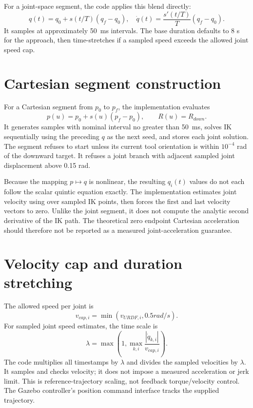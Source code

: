 For a joint-space segment, the code applies this blend directly:
\begin{equation}
 q(t)=q_0+s(t/T)(q_f-q_0),\quad
 \dot q(t)=\frac{s'(t/T)}{T}(q_f-q_0).
 \label{eq:joint-quintic}
\end{equation}
It samples at approximately \SI{50}{ms} intervals. The base duration defaults
to 8 s for the approach, then time-stretches if a sampled speed exceeds the
allowed joint speed cap.

\section{Cartesian segment construction}
For a Cartesian segment from $p_0$ to $p_f$, the implementation evaluates
\begin{equation}
 p(u)=p_0+s(u)(p_f-p_0),\qquad R(u)=R_{down}.
\end{equation}
It generates samples with nominal interval no greater than \SI{50}{ms}, solves
IK sequentially using the preceding $q$ as the next seed, and stores each
joint solution. The segment refuses to start unless its current tool
orientation is within $10^{-4}$ rad of the downward target. It refuses a
joint branch with adjacent sampled joint displacement above 0.15 rad.

Because the mapping $p\mapsto q$ is nonlinear, the resulting $q_i(t)$ values
do not each follow the scalar quintic equation exactly. The implementation
estimates joint velocity using  over sampled IK points,
then forces the first and last velocity vectors to zero. Unlike the joint
segment, it does not compute the analytic second derivative of the IK path.
The theoretical zero endpoint Cartesian acceleration should therefore not be
reported as a measured joint-acceleration guarantee.

\section{Velocity cap and duration stretching}
The allowed speed per joint is
\begin{equation}
 v_{cap,i}=\min(v_{URDF,i},0.5\si{rad/s}).
\end{equation}
For sampled joint speed estimates, the time scale is
\begin{equation}
 \lambda=\max\left(1,\max_{k,i}\frac{|\dot q_{k,i}|}{v_{cap,i}}\right).
 \label{eq:time-stretch}
\end{equation}
The code multiplies all timestamps by $\lambda$ and divides the sampled
velocities by $\lambda$. It samples and checks velocity; it does not impose a
measured acceleration or jerk limit. This is reference-trajectory scaling,
not feedback torque/velocity control. The Gazebo controller's position
command interface tracks the supplied trajectory.

